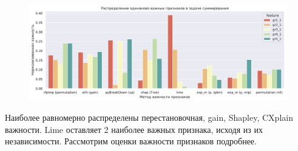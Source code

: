 \documentclass[12pt]{article}
\begin{document}
\begin{figure}[h]
\centering
\includegraphics[width=\textwidth]{images/TargetSum_impFeatures.pdf}
\end{figure}
Наиболее равномерно распределены перестановочная, gain, Shapley, CXplain важности. Lime оставляет 2 наиболее важных признака, исходя из их независимости. Рассмотрим оценки важности признаков подробнее.
\newpage
\end{document}

